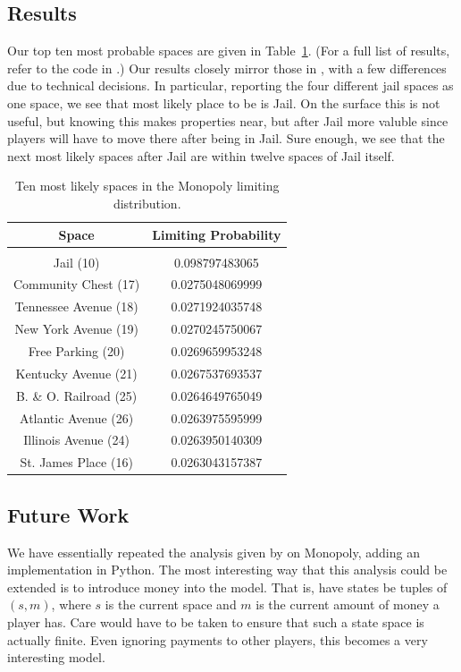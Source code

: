 \documentclass[12pt]{article}
\theoremstyle{definition}
\begin{document}
\subsection{Results}
\label{sub:results}

Our top ten most probable spaces are given in Table~\ref{tab:results}. (For a
full list of results, refer to the code in
\cite{dougherty-bliss2016boardwalk}.) Our results closely mirror those in
\cite{abbott1997boardwalk}, with a few differences due to technical decisions.
In particular, reporting the four different jail spaces as one space, we see
that most likely place to be is Jail. On the surface this is not useful, but
knowing this makes properties near, but after Jail more valuble since players
will have to move there after being in Jail. Sure enough, we see that the next
most likely spaces after Jail are within twelve spaces of Jail itself.

\begin{table}
\centering
\caption{Ten most likely spaces in the Monopoly limiting distribution.}
\label{tab:results}
\begin{tabular}{c | c}
         Space & Limiting Probability \\
         \hline \\
             Jail (10) & 0.098797483065 \\
  Community Chest (17) & 0.0275048069999 \\
 Tennessee Avenue (18) & 0.0271924035748 \\
  New York Avenue (19) & 0.0270245750067 \\
     Free Parking (20) & 0.0269659953248 \\
  Kentucky Avenue (21) & 0.0267537693537 \\
 B. \& O. Railroad (25) & 0.0264649765049 \\
  Atlantic Avenue (26) & 0.0263975595999 \\
  Illinois Avenue (24) & 0.0263950140309 \\
  St. James Place (16) & 0.0263043157387
\end{tabular}
\end{table}

\subsection{Future Work}
\label{sub:future_work}

We have essentially repeated the analysis given by \citet{abbott1997boardwalk}
on Monopoly, adding an implementation in Python. The most interesting way that
this analysis could be extended is to introduce money into the model. That is,
have states be tuples of $(s, m)$, where $s$ is the current space and $m$ is
the current amount of money a player has. Care would have to be taken to ensure
that such a state space is actually finite. Even ignoring payments to other
players, this becomes a very interesting model.
\end{document}
